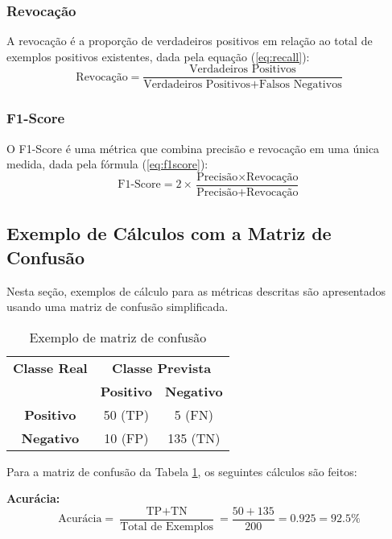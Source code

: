 \subsubsection{Revocação}
A revocação é a proporção de verdadeiros positivos em relação ao total de exemplos positivos existentes, dada pela equação (\ref{eq:recall}):
\begin{equation}
\text{Revocação} = \frac{\text{Verdadeiros Positivos}}{\text{Verdadeiros Positivos} + \text{Falsos Negativos}} \label{eq:recall}
\end{equation}

\subsubsection{F1-Score}
O F1-Score é uma métrica que combina precisão e revocação em uma única medida, dada pela fórmula (\ref{eq:f1score}):
\begin{equation}
\text{F1-Score} = 2 \times \frac{\text{Precisão} \times \text{Revocação}}{\text{Precisão} + \text{Revocação}} \label{eq:f1score}
\end{equation}

\subsection{Exemplo de Cálculos com a Matriz de Confusão}

Nesta seção, exemplos de cálculo para as métricas descritas são apresentados usando uma matriz de confusão simplificada.

\begin{table}[h]
\centering
\caption{Exemplo de matriz de confusão}
\label{tab:exemplo_matriz_confusao}
\begin{tabular}{c|cc}
\multicolumn{1}{c}{\textbf{Classe Real}} & \multicolumn{2}{c}{\textbf{Classe Prevista}} \\ \cline{2-3}
\multicolumn{1}{c}{} & \textbf{Positivo} & \textbf{Negativo} \\ \hline
\textbf{Positivo} & 50 (TP) & 5 (FN) \\
\textbf{Negativo} & 10 (FP) & 135 (TN) \\ \hline
\end{tabular}
\end{table}

Para a matriz de confusão da Tabela \ref{tab:exemplo_matriz_confusao}, os seguintes cálculos são feitos:

\textbf{Acurácia:}
\[ \text{Acurácia} = \frac{\text{TP} + \text{TN}}{\text{Total de Exemplos}} = \frac{50 + 135}{200} = 0.925 = 92.5\% \]

